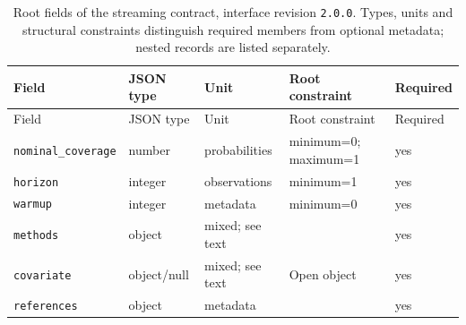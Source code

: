 \begingroup\small
\begin{longtable}{@{}p{}p{}p{}p{}p{}@{}}
\caption{Root fields of the streaming contract, interface revision \texttt{2.0.0}. Types, units and structural constraints distinguish required members from optional metadata; nested records are listed separately.}\label{tab:contract-streaming}\\
\toprule Field & JSON type & Unit & Root constraint & Required\\\midrule\endfirsthead
\toprule Field & JSON type & Unit & Root constraint & Required\\\midrule\endhead
\texttt{nominal\_\allowbreak{}coverage} & number & probabilities & minimum=0; maximum=1 & yes\\
\texttt{horizon} & integer & observations & minimum=1 & yes\\
\texttt{warmup} & integer & metadata & minimum=0 & yes\\
\texttt{methods} & object & mixed; see text &  & yes\\
\texttt{covariate} & object/null & mixed; see text & Open object & yes\\
\texttt{references} & object & metadata &  & yes\\
\bottomrule
\end{longtable}
\endgroup
